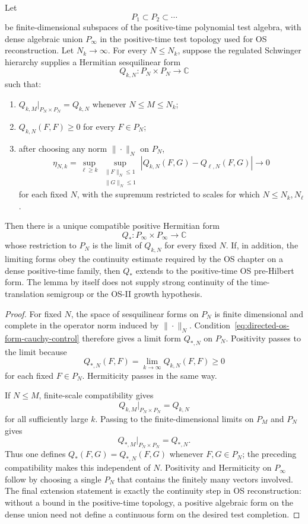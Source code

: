 \begin{lemma}
\label{lem:rg-directed-os-positive-form-assembly}
Let
\[
  P_1\subset P_2\subset\cdots
\]
be finite-dimensional subspaces of the positive-time polynomial test algebra,
with dense algebraic union \(P_\infty\) in the positive-time test topology
used for OS reconstruction.  Let \(N_k\to\infty\).  For every
\(N\le N_k\), suppose the regulated Schwinger hierarchy supplies a Hermitian
sesquilinear form
\[
  Q_{k,N}:P_N\times P_N\longrightarrow\mathbb C
\]
such that:
\begin{enumerate}
  \item \(Q_{k,M}|_{P_N\times P_N}=Q_{k,N}\) whenever
  \(N\le M\le N_k\);
  \item \(Q_{k,N}(F,F)\ge0\) for every \(F\in P_N\);
  \item after choosing any norm \(\|\cdot\|_N\) on \(P_N\),
  \begin{equation}
    \eta_{N,k}
    =
    \sup_{\ell\ge k}
    \sup_{\substack{\|F\|_N\le1\\ \|G\|_N\le1}}
    |Q_{k,N}(F,G)-Q_{\ell,N}(F,G)|
    \longrightarrow0
    \label{eq:directed-os-form-cauchy-control}
  \end{equation}
  for each fixed \(N\), with the supremum restricted to scales for which
  \(N\le N_k,N_\ell\).
\end{enumerate}
Then there is a unique compatible positive Hermitian form
\[
  Q_\ast:P_\infty\times P_\infty\longrightarrow\mathbb C
\]
whose restriction to \(P_N\) is the limit of \(Q_{k,N}\) for every fixed
\(N\).  If, in addition, the limiting forms obey the continuity estimate
required by the OS chapter on a dense positive-time family, then \(Q_\ast\)
extends to the positive-time OS pre-Hilbert form.  The lemma by itself does
not supply strong continuity of the time-translation semigroup or the OS-II
growth hypothesis.
\end{lemma}

\begin{proof}
For fixed \(N\), the space of sesquilinear forms on \(P_N\) is finite
dimensional and complete in the operator norm induced by \(\|\cdot\|_N\).
Condition~\eqref{eq:directed-os-form-cauchy-control} therefore gives a
limit form \(Q_{\ast,N}\) on \(P_N\).  Positivity passes to the limit because
\[
  Q_{\ast,N}(F,F)=\lim_{k\to\infty} Q_{k,N}(F,F)\ge0
\]
for each fixed \(F\in P_N\).  Hermiticity passes in the same way.

If \(N\le M\), finite-scale compatibility gives
\[
  Q_{k,M}|_{P_N\times P_N}=Q_{k,N}
\]
for all sufficiently large \(k\).  Passing to the finite-dimensional limits
on \(P_M\) and \(P_N\) gives
\[
  Q_{\ast,M}|_{P_N\times P_N}=Q_{\ast,N}.
\]
Thus one defines \(Q_\ast(F,G)=Q_{\ast,N}(F,G)\) whenever
\(F,G\in P_N\); the preceding compatibility makes this independent of
\(N\).  Positivity and Hermiticity on \(P_\infty\) follow by choosing a
single \(P_N\) that contains the finitely many vectors involved.  The final
extension statement is exactly the continuity step in OS reconstruction:
without a bound in the positive-time topology, a positive algebraic form on
the dense union need not define a continuous form on the desired test
completion.
\end{proof}

